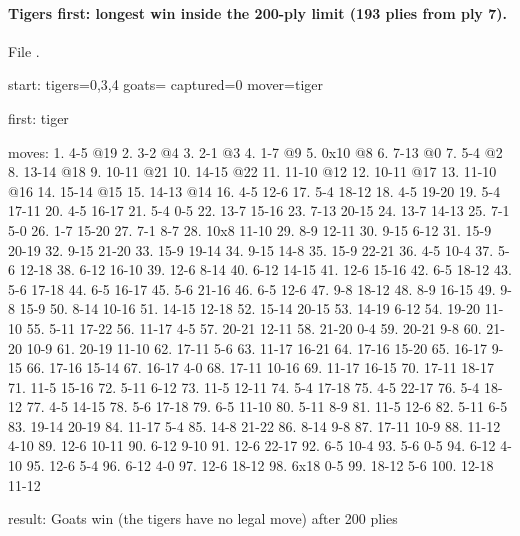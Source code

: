 \paragraph{Tigers first: longest win inside the 200-ply limit (193 plies from ply 7).} File .
\begin{gamelisting}
start: tigers=0,3,4 goats= captured=0 mover=tiger\par
first: tiger\par
moves: 1. 4-5 @19 2. 3-2 @4 3. 2-1 @3 4. 1-7 @9 5. 0x10 @8 6. 7-13 @0 7. 5-4 @2 8. 13-14 @18 9. 10-11 @21 10. 14-15 @22 11. 11-10 @12 12. 10-11 @17 13. 11-10 @16 14. 15-14 @15 15. 14-13 @14 16. 4-5 12-6 17. 5-4 18-12 18. 4-5 19-20 19. 5-4 17-11 20. 4-5 16-17 21. 5-4 0-5 22. 13-7 15-16 23. 7-13 20-15 24. 13-7 14-13 25. 7-1 5-0 26. 1-7 15-20 27. 7-1 8-7 28. 10x8 11-10 29. 8-9 12-11 30. 9-15 6-12 31. 15-9 20-19 32. 9-15 21-20 33. 15-9 19-14 34. 9-15 14-8 35. 15-9 22-21 36. 4-5 10-4 37. 5-6 12-18 38. 6-12 16-10 39. 12-6 8-14 40. 6-12 14-15 41. 12-6 15-16 42. 6-5 18-12 43. 5-6 17-18 44. 6-5 16-17 45. 5-6 21-16 46. 6-5 12-6 47. 9-8 18-12 48. 8-9 16-15 49. 9-8 15-9 50. 8-14 10-16 51. 14-15 12-18 52. 15-14 20-15 53. 14-19 6-12 54. 19-20 11-10 55. 5-11 17-22 56. 11-17 4-5 57. 20-21 12-11 58. 21-20 0-4 59. 20-21 9-8 60. 21-20 10-9 61. 20-19 11-10 62. 17-11 5-6 63. 11-17 16-21 64. 17-16 15-20 65. 16-17 9-15 66. 17-16 15-14 67. 16-17 4-0 68. 17-11 10-16 69. 11-17 16-15 70. 17-11 18-17 71. 11-5 15-16 72. 5-11 6-12 73. 11-5 12-11 74. 5-4 17-18 75. 4-5 22-17 76. 5-4 18-12 77. 4-5 14-15 78. 5-6 17-18 79. 6-5 11-10 80. 5-11 8-9 81. 11-5 12-6 82. 5-11 6-5 83. 19-14 20-19 84. 11-17 5-4 85. 14-8 21-22 86. 8-14 9-8 87. 17-11 10-9 88. 11-12 4-10 89. 12-6 10-11 90. 6-12 9-10 91. 12-6 22-17 92. 6-5 10-4 93. 5-6 0-5 94. 6-12 4-10 95. 12-6 5-4 96. 6-12 4-0 97. 12-6 18-12 98. 6x18 0-5 99. 18-12 5-6 100. 12-18 11-12\par
result: Goats win (the tigers have no legal move) after 200 plies\par
\end{gamelisting}

